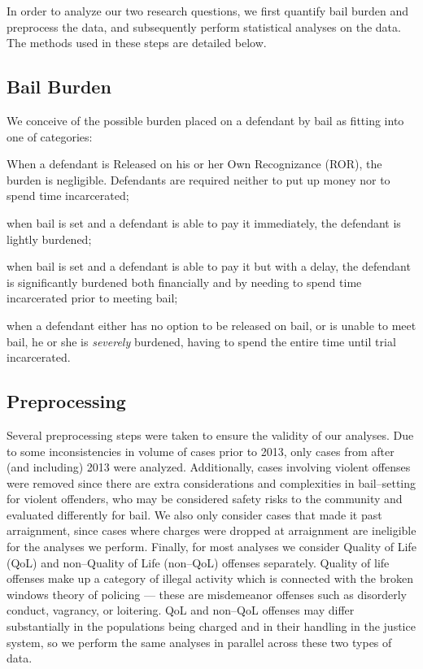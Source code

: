 In order to analyze our two research questions,
we first quantify bail burden and preprocess the data,
and subsequently perform statistical analyses on the data.
The methods used in these steps are detailed below.


\subsection{Bail Burden}
We conceive of the possible burden placed on a defendant by bail as fitting into one of
\nextitemizecount{} categories:
\begin{inlinelist}
  \item When a defendant is Released on his or her Own Recognizance (ROR),
  the burden is negligible.
  Defendants are required neither to put up money nor to spend time incarcerated; 
  \item when bail is set and a defendant is able to pay it immediately,
  the defendant is lightly burdened; 
  \item when bail is set and a defendant is able to pay it but with a delay,
    the defendant is significantly burdened both
    financially and by
    needing to spend time incarcerated prior to meeting bail; 
  \item when a defendant either has no option to be released on bail,
  or is unable to meet bail,
    he or she is \textit{severely} burdened,
    having to spend the entire time until trial incarcerated.
\end{inlinelist}

\subsection{Preprocessing}
Several preprocessing steps were taken to ensure the validity of our analyses.
Due to some inconsistencies in volume of cases prior to 2013,
only cases from after (and including) 2013 were analyzed.
Additionally,
cases involving violent offenses were removed since
there are extra considerations and complexities in bail--setting for violent offenders,
who may be considered safety risks to the community and evaluated differently for bail.
We also only consider cases that made it past arraignment,
since cases where charges were dropped at arraignment are ineligible for the analyses we perform.
Finally,
for most analyses we consider Quality of Life (QoL) and non--Quality of Life (non--QoL) offenses separately.
Quality of life offenses make up a category of illegal activity which is connected with the broken windows theory of policing
--- these are misdemeanor offenses such as
  disorderly conduct,
  vagrancy,
  or
  loitering.
QoL and non--QoL offenses may differ substantially in the populations being charged and in their handling in the justice system,
so we perform the same analyses in parallel across these two types of data.



